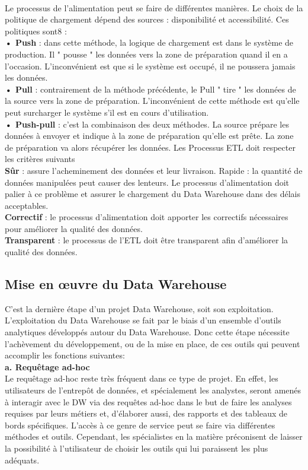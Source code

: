 \paragraph{}
Le processus de l’alimentation peut se faire de différentes manières. Le choix de la politique de chargement dépend des sources : disponibilité et accessibilité. Ces politiques
sont8 :\\
\textbf{• Push} : dans cette méthode, la logique de chargement est dans le système de production. Il " pousse " les données vers la zone de préparation quand il en a l'occasion. L'inconvénient est que si le système est occupé, il ne poussera jamais les données.\\
\textbf{• Pull} : contrairement de la méthode précédente, le Pull " tire " les données de la source vers la zone de préparation. L'inconvénient de cette méthode est qu'elle peut surcharger le système s'il est en cours d'utilisation.\\
\textbf{• Push-pull} : c'est la combinaison des deux méthodes. La source prépare les données à envoyer et indique à la zone de préparation qu'elle est prête. La zone de préparation va alors récupérer les données.
Les Processus ETL doit respecter les critères suivants\\
\textbf{Sûr }: assure l’acheminement des données et leur livraison.
Rapide : la quantité de données manipulées peut causer des lenteurs. Le processus d’alimentation doit palier à ce problème et assurer le chargement du Data Warehouse dans des délais acceptables.\\
\textbf{Correctif }: le processus d’alimentation doit apporter les correctifs nécessaires pour améliorer la qualité des données.\\
\textbf{Transparent} : le processus de l’ETL doit être transparent afin d’améliorer la qualité des données.


\subsection{Mise en œuvre du Data Warehouse}
  C’est la dernière étape d’un projet Data Warehouse, soit son exploitation. L’exploitation du Data Warehouse se fait par le biais d’un ensemble d’outils analytiques développés autour du Data Warehouse. Donc cette étape nécessite l’achèvement du développement, ou de la mise en place, de ces outils qui peuvent accomplir les fonctions suivantes:\\
  
 \textbf{a. Requêtage ad-hoc}\\ 
  Le requêtage ad-hoc reste très fréquent dans ce type de projet. En effet, les utilisateurs de l’entrepôt de données, et spécialement les analystes, seront amenés à interagir avec le DW via des requêtes ad-hoc dans le but de faire les analyses requises par leurs métiers et, d’élaborer aussi, des rapports et des tableaux de bords spécifiques. L’accès à ce genre de service peut se faire via différentes méthodes et outils. Cependant, les spécialistes en la matière préconisent de laisser la possibilité à l’utilisateur de choisir les outils qui lui paraissent les plus adéquats.
  
